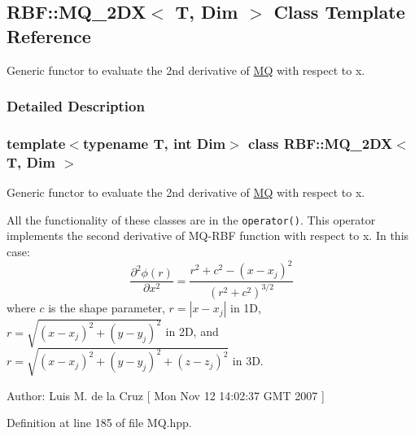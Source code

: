 \hypertarget{classRBF_1_1MQ__2DX}{
\subsection{RBF::MQ\_\-2DX$<$ T, Dim $>$ Class Template Reference}
\label{classRBF_1_1MQ__2DX}
}
Generic functor to evaluate the 2nd derivative of \hyperlink{classRBF_1_1MQ}{MQ} with respect to x.  




\subsubsection{Detailed Description}
\subsubsection*{template$<$typename T, int Dim$>$ class RBF::MQ\_\-2DX$<$ T, Dim $>$}

Generic functor to evaluate the 2nd derivative of \hyperlink{classRBF_1_1MQ}{MQ} with respect to x. 

All the functionality of these classes are in the {\tt operator()}. This operator implements the second derivative of MQ-RBF function with respect to x. In this case: \[ \frac{\partial^2 \phi(r)}{\partial x^2} = \frac{r^2 + c^2 - (x-x_j)^2 }{(r^2+c^2)^{3/2}} \] where $ c $ is the shape parameter, $ r = |x - x_j| $ in 1D, $ r = \sqrt{(x - x_j)^2 + (y - y_j)^2} $ in 2D, and $ r = \sqrt{(x - x_j)^2 + (y - y_j)^2 + (z - z_j)^2} $ in 3D.

\begin{Desc}
\item[Author:]Luis M. de la Cruz \mbox{[} Mon Nov 12 14:02:37 GMT 2007 \mbox{]} \end{Desc}


Definition at line 185 of file MQ.hpp.